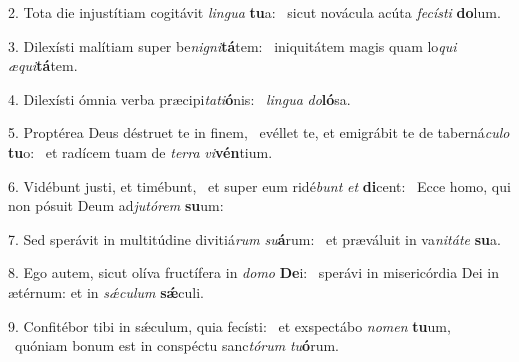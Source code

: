 2. Tota die injustítiam cogitávit \textit{lin}\textit{gua} \textbf{tu}a: \ast\  sicut novácula acúta \textit{fe}\textit{cís}\textit{ti} \textbf{do}lum.\

3. Dilexísti malítiam super be\textit{ni}\textit{gni}\textbf{tá}tem: \ast\  iniquitátem magis quam lo\textit{qui} \textit{æ}\textit{qui}\textbf{tá}tem.\

4. Dilexísti ómnia verba præcipi\textit{ta}\textit{ti}\textbf{ó}nis: \ast\  \textit{lin}\textit{gua} \textit{do}\textbf{ló}sa.\

5. Proptérea Deus déstruet te in finem, \dag\  evéllet te, et emigrábit te de taberná\textit{cu}\textit{lo} \textbf{tu}o: \ast\  et radícem tuam de \textit{ter}\textit{ra} \textit{vi}\textbf{vén}tium.\

6. Vidébunt justi, et timébunt, \dag\  et super eum ridé\textit{bunt} \textit{et} \textbf{di}cent: \ast\  Ecce homo, qui non pósuit Deum ad\textit{ju}\textit{tó}\textit{rem} \textbf{su}um:\

7. Sed sperávit in multitúdine divitiá\textit{rum} \textit{su}\textbf{á}rum: \ast\  et præváluit in va\textit{ni}\textit{tá}\textit{te} \textbf{su}a.\

8. Ego autem, sicut olíva fructífera in \textit{do}\textit{mo} \textbf{De}i: \ast\  sperávi in misericórdia Dei in ætérnum: et in \textit{sǽ}\textit{cu}\textit{lum} \textbf{sǽ}culi.\

9. Confitébor tibi in sǽculum, quia fecísti: \dag\  et exspectábo \textit{no}\textit{men} \textbf{tu}um, \ast\  quóniam bonum est in conspéctu sanc\textit{tó}\textit{rum} \textit{tu}\textbf{ó}rum.\

